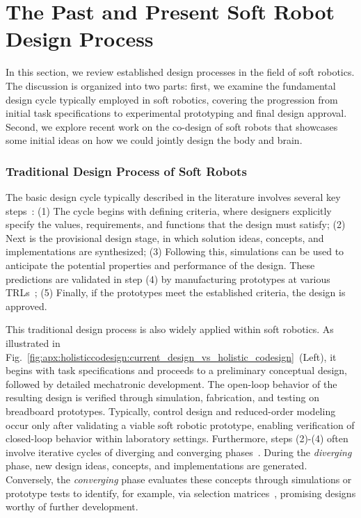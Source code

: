 \section{The Past and Present Soft Robot Design Process}\label{sec:apx:holisticcodesign:related_work}

In this section, we review established design processes in the field of soft robotics. The discussion is organized into two parts: first, we examine the fundamental design cycle typically employed in soft robotics, covering the progression from initial task specifications to experimental prototyping and final design approval. Second, we explore recent work on the co-design of soft robots that showcases some initial ideas on how we could jointly design the body and brain.

\subsubsection{Traditional Design Process of Soft Robots}
The basic design cycle typically described in the literature involves several key steps~\citep{roozenburg1995product, van2020delft}: (1) The cycle begins with defining criteria, where designers explicitly specify the values, requirements, and functions that the design must satisfy; (2) Next is the provisional design stage, in which solution ideas, concepts, and implementations are synthesized; (3) Following this, simulations can be used to anticipate the potential properties and performance of the design. These predictions are validated in step (4) by manufacturing prototypes at various \glspl{TRL}~\citep{NASA_TRL}; (5) Finally, if the prototypes meet the established criteria, the design is approved.

This traditional design process is also widely applied within soft robotics. As illustrated in Fig.~\ref{fig:apx:holisticcodesign:current_design_vs_holistic_codesign}~(Left), it begins with task specifications and proceeds to a preliminary conceptual design, followed by detailed mechatronic development. The open-loop behavior of the resulting design is verified through simulation, fabrication, and testing on breadboard prototypes. Typically, control design and reduced-order modeling occur only after validating a viable soft robotic prototype, enabling verification of closed-loop behavior within laboratory settings. Furthermore, steps (2)-(4) often involve iterative cycles of diverging and converging phases~\citep{feldhusen2013pahl}. During the \emph{diverging} phase, new design ideas, concepts, and implementations are generated. Conversely, the \emph{converging} phase evaluates these concepts through simulations or prototype tests to identify, for example, via selection matrices~\citep{ulrich2016product}, promising designs worthy of further development.

